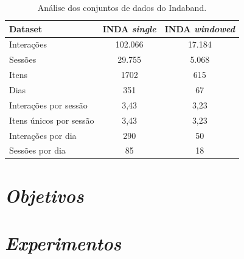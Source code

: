   \begin{table}
    \centering
    \begin{tabular}{lcc}
        \toprule
        \textbf{Dataset} & \textbf{INDA \textit{single}} & \textbf{INDA \textit{windowed}}\\
        \midrule
        Interações & 102.066 & 17.184  \\
        Sessões & 29.755 & 5.068  \\
        Itens & 1702 & 615  \\
        Dias & 351 & 67  \\
        \hline
        Interações por sessão & 3,43 & 3,23 \\
        Itens únicos por sessão & 3,43 & 3,23 \\
        Interações por dia & 290 & 50 \\
        Sessões por dia & 85 & 18 \\
        \bottomrule
    \end{tabular}
    \caption{Análise dos conjuntos de dados do Indaband.}
    \label{tab:datasets_including_inda}
  \end{table}

  \section{\textit{Objetivos}} 

  
  
  \section{\textit{Experimentos}} 




